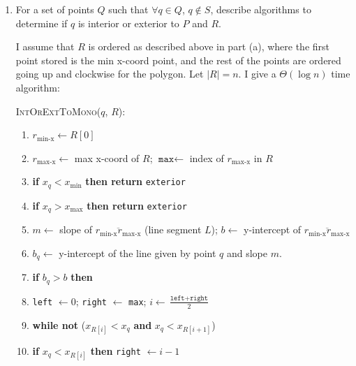 \documentclass [12pt]{article}
\begin{document}
\begin{enumerate}[label=(\alph*)]
        \pagebreak
        
        \item For a set of points $Q$ such that $\forall q \in Q$, $q \notin S$, describe algorithms to determine if $q$ is interior or exterior to $P$ and $R$. 
        
        I assume that $R$ is ordered as described above in part (a), where the first point stored is the min x-coord point, and the rest of the points are ordered going up and clockwise for the polygon. Let $|R| = n$. I give a $\Theta(\log n)$ time algorithm:
        
        \cbstart
            \textsc{IntOrExtToMono($q$, $R$)}:
            \begin{enumerate}[label=\arabic*.]
                \item $r_{\text{min-x}} \leftarrow R[0]$
                \item $r_{\text{max-x}} \leftarrow$ max x-coord of $R$; \hspace{1cm}$\texttt{max}\leftarrow $ index of $r_{\text{max-x}}$ in $R$
                \item \textbf{if} $x_q < x_{\text{min}}$ \textbf{then return} \texttt{exterior}
                \item \textbf{if} $x_q > x_{\text{max}}$ \textbf{then return} \texttt{exterior}
                \item $m \leftarrow $ slope of $\overline{r_{\text{min-x}} r_{\text{max-x}}}$ (line segment $L$); \hspace{1cm}$b \leftarrow $ y-intercept of $\overline{r_{\text{min-x}} r_{\text{max-x}}}$
                \item $b_q \leftarrow$ y-intercept of the line given by point $q$ and slope $m$.
                \item \textbf{if} $b_q > b$ \textbf{then} 
                
                \item \hspace{1cm} \texttt{left} $\leftarrow 0$; \texttt{right} $\leftarrow$ \texttt{max}; $i\leftarrow \frac{\texttt{left} + \texttt{right}}{2}$

                \item \hspace{1cm} \textbf{while not} ($x_{R[i]} < x_q$ \textbf{and} $x_q < x_{R[i+1]}$)
                
                \item \hspace{2cm} \textbf{if} $x_q < x_{R[i]}$ \textbf{then} \texttt{right} $\leftarrow i - 1$
                

\end{enumerate}
\end{enumerate}
\end{document}
